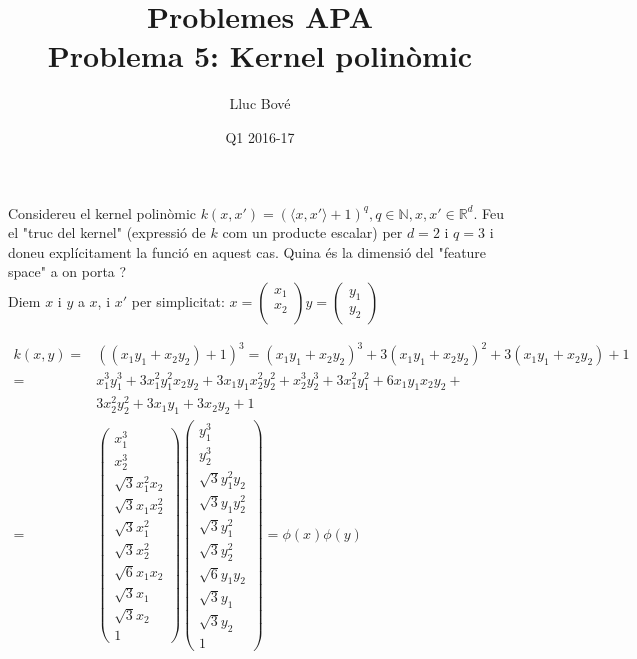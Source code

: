 \documentclass[a4paper]{article}
\title{Problemes APA \\ Problema 5: Kernel polinòmic}
\author{Lluc Bové}
\date{Q1 2016-17}
\begin{document}
\maketitle


Considereu el kernel polinòmic $k(x,x') = (\langle x,x' \rangle + 1)^q, q \in \mathbb{N}, x,x' \in \mathbb{R}^d$. Feu el "truc del kernel" (expressió de $k$ com un producte escalar) per $d = 2$ i $q = 3$ i doneu explícitament la funció \phi en aquest cas. Quina és la dimensió del "feature space" a on porta \phi?
\\
Diem  $x$ i $y$ a $x$, i $x'$ per simplicitat:
$
x = 
\begin{pmatrix}
x_1 \\
x_2 \\
\end{pmatrix}
y= 
\begin{pmatrix}
y_1 \\
y_2
\end{pmatrix}
$

\begin{align*}
	k(x,y) =& ((x_1y_1 + x_2y_2) + 1) ^3 = (x_1y_1 +x_2y_2)^3 + 3(x_1y_1 +x_2y_2)^2 +3(x_1y_1 +x_2y_2) + 1\\
	=&x_1^3y_1^3 + 3x_1^2y_1^2x_2y_2 + 3x_1y_1x_2^2y_2^2 + x_2^3y_2^3 + 3x_1^2y_1^2 + 6x_1y_1x_2y_2 +  \\ &3x_2^2y_2^2 + 3x_1y_1 + 3x_2y_2 + 1 \\
	=&\begin{pmatrix}
	x_1^3 \\
	x_2^3 \\
	\sqrt{3}x_1^2x_2 \\
	\sqrt{3}x_1x_2^2 \\
	\sqrt{3}x_1^2 \\
	\sqrt{3}x_2^2 \\
	\sqrt{6} x_1x_2\\
	\sqrt{3}x_1\\
	\sqrt{3}x_2\\
	1
	\end{pmatrix}
	\begin{pmatrix}
	y_1^3 \\
	y_2^3 \\
	\sqrt{3}y_1^2y_2 \\
	\sqrt{3}y_1y_2^2 \\
	\sqrt{3}y_1^2 \\
	\sqrt{3}y_2^2 \\
	\sqrt{6} y_1y_2\\
	\sqrt{3}y_1\\
	\sqrt{3}y_2\\
	1
	\end{pmatrix}
	= \phi(x)\phi(y)
\end{align*}
\end{document}
